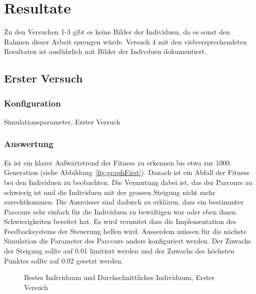 %
%

\chapter{Resultate\label{chap:Resultate}}

Zu den Versuchen 1-3 gibt es keine Bilder der Individuen, da es sonst den Rahmen dieser Arbeit sprengen würde.
Versuch 4 mit den vielversprechendsten Resultaten ist ausführlich mit Bilder der Indivduen dokumentiert.

\section{Erster Versuch}

  \subsection{Konfiguration}

    \begin{table}[H]
      \centering
      
      \caption{Simulationsparameter, Erster Versuch}
    \end{table}

  \subsection{Auswertung}

    Es ist ein klarer Aufwärtstrend der Fitness zu erkennen bis etwa zur 1000. Generation (siehe Abbildung~\vref{fig:graphFirst}).
    Danach ist ein Abfall der Fitness bei den Individuen zu beobachten.
    Die Vermutung dabei ist, das der Parcours zu schwierig ist und die Individuen
    mit der grossen Steigung nicht mehr zurechtkommen.
    Die Ausreisser sind dadurch zu erklären,
    dass ein bestimmter Parcours sehr einfach für die Individuen zu bewältigen war oder eben ihnen Schwierigkeiten bereitet hat.
    Es wird vermutet dass die Implementation des Feedbacksystems der Steuerung helfen wird.
    Ausserdem müssen für die nächste Simulation die Parameter des Parcours anders konfiguriert werden.
    Der Zuwachs der Steigung sollte auf 0.01 limitiert werden und der Zuwachs des höchsten Punktes
    sollte auf 0.02 gesetzt werden.

    \begin{figure}
      \centering
      
      \caption{Bestes Individuum und Durchschnittliches Individuum, Erster Versuch\label{fig:graphFirst}}
    \end{figure}

